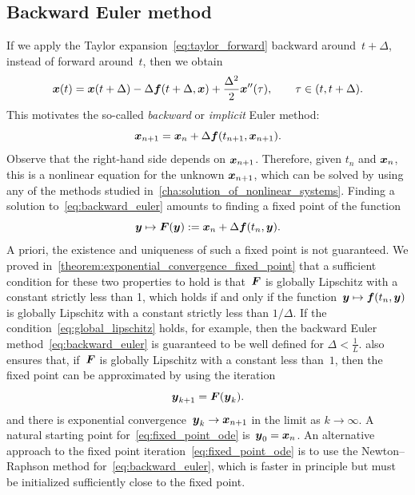\subsection{Backward Euler method}
\label{sub:implicit_euler}
If we apply the Taylor expansion~\eqref{eq:taylor_forward} backward around~$t + \Delta$,
instead of forward around~$t$,
then we obtain
\[
    \label{eq:taylor_backward}
    \mathbf{\boldsymbol{x}}(t) = \mathbf{\boldsymbol{x}}(t + \Delta) - \Delta \mathbf{\boldsymbol{f}}(t + \Delta, \mathbf{\boldsymbol{x}}) + \frac{\Delta^2}{2} \mathbf{\boldsymbol{x}}''(\tau),
    \qquad \tau \in (t, t+\Delta).
\]
This motivates the so-called \emph{backward} or \emph{implicit} Euler method:
\begin{equation}
    \label{eq:backward_euler}
    \mathbf{\boldsymbol{x}}_{n+1} = \mathbf{\boldsymbol{x}}_{n} + \Delta \mathbf{\boldsymbol{f}}(t_{n+1}, \mathbf{\boldsymbol{x}}_{n+1}).
\end{equation}
Observe that the right-hand side depends on $\mathbf{\boldsymbol{x}}_{n+1}$.
Therefore, given $t_n$ and $\mathbf{\boldsymbol{x}}_n$,
this is a nonlinear equation for the unknown $\mathbf{\boldsymbol{x}}_{n+1}$,
which can be solved by using any of the methods studied in~\cref{cha:solution_of_nonlinear_systems}.
Finding a solution to~\eqref{eq:backward_euler} amounts to finding a fixed point of the function
\[
    \mathbf{\boldsymbol{y}} \mapsto \mathbf{\boldsymbol{F}}(\mathbf{\boldsymbol{y}}) := \mathbf{\boldsymbol{x}}_{n} + \Delta \mathbf{\boldsymbol{f}}(t_n, \mathbf{\boldsymbol{y}}).
\]
A priori, the existence and uniqueness of such a fixed point is not guaranteed.
We proved in~\cref{theorem:exponential_convergence_fixed_point} that a sufficient condition for these two properties to hold is
that~$\mathbf{\boldsymbol{F}}$ is globally Lipschitz with a constant strictly less than 1,
which holds if and only if the function~$\mathbf{\boldsymbol{y}} \mapsto \mathbf{\boldsymbol{f}}(t_n, \mathbf{\boldsymbol{y}})$ is globally Lipschitz with a constant strictly less than $1/\Delta$.
If the condition~\eqref{eq:global_lipschitz} holds, for example,
then the backward Euler method~\eqref{eq:backward_euler} is guaranteed to be well defined for $\Delta < \frac{1}{L}$.
 also ensures that, if~$\mathbf{\boldsymbol{F}}$ is globally Lipschitz with a constant less than~$1$,
then the fixed point can be approximated by using the iteration
\begin{equation}
    \label{eq:fixed_point_ode}
    \mathbf{\boldsymbol{y}}_{k+1} = \mathbf{\boldsymbol{F}}(\mathbf{\boldsymbol{y}}_k).
\end{equation}
and there is exponential convergence~$\mathbf{\boldsymbol{y}}_k \to \mathbf{\boldsymbol{x}}_{n+1}$ in the limit as $k \to \infty$.
A natural starting point for~\eqref{eq:fixed_point_ode} is~$\mathbf{\boldsymbol{y}}_0 = \mathbf{\boldsymbol{x}}_n$.
An alternative approach to the fixed point iteration~\eqref{eq:fixed_point_ode} is to use the Newton--Raphson method for~\eqref{eq:backward_euler},
which is faster in principle but must be initialized sufficiently close to the fixed point.

